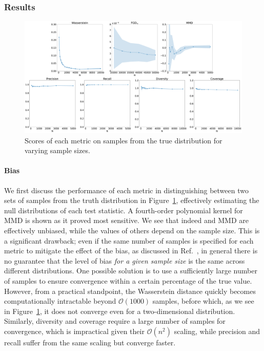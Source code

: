 \subsubsection{Results}
\label{sec:04_evaluating_toydata_results}

\begin{figure}[ht]
    \includegraphics[width=\textwidth]{figures/04-ML4Sim/evaluating/truth_scores.pdf}
    \caption{Scores of each metric on samples from the true distribution for varying sample sizes.}
    \label{fig:04_evaluating_toy_truth_scores}
\end{figure}

\paragraph{Bias}

We first discuss the performance of each metric in distinguishing between two sets of samples from the truth distribution in Figure~\ref{fig:04_evaluating_toy_truth_scores}, effectively estimating the null distributions of each test statistic.
A fourth-order polynomial kernel for MMD is shown as it proved most sensitive.
We see that indeed \fgdinf and MMD are effectively unbiased, while the values of others depend on the sample size.
This is a significant drawback; even if the same number of samples is specified for each metric to mitigate the effect of the bias, as discussed in Ref.~\cite{chong_unbiasedfid}, in general there is no guarantee that the level of bias \textit{for a given sample size} is the same across different distributions.
One possible solution is to use a sufficiently large number of samples to ensure convergence within a certain percentage of the true value.
However, from a practical standpoint, the Wasserstein distance quickly becomes computationally intractable beyond $\mathcal{O}(1000)$ samples, before which, as we see in Figure~\ref{fig:04_evaluating_toy_truth_scores}, it does not converge even for a two-dimensional distribution.
Similarly, diversity and coverage require a large number of samples for convergence, which is impractical given their $\mathcal{O}(n^2)$ scaling, while precision and recall suffer from the same scaling but converge faster.

